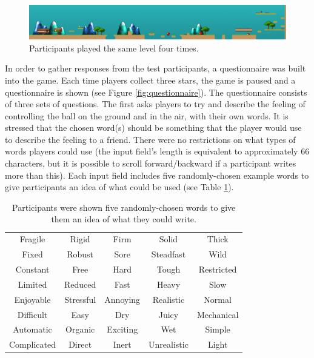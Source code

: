 \begin{figure}[htbp]
\centering
\includegraphics[width=1\textwidth]{Pics/levelStructure}
\caption{Participants played the same level four times.}
\label{fig:level}
\end{figure}

In order to gather responses from the test participants, a questionnaire was built into the game. Each time players collect three stars, the game is paused and a questionnaire is shown (see Figure \ref{fig:questionnaire}). The questionnaire consists of three sets of questions. The first asks players to try and describe the feeling of controlling the ball on the ground and in the air, with their own words. It is stressed that the chosen word(s) should be something that the player would use to describe the feeling to a friend. There were no restrictions on what types of words players could use (the input field's length is equivalent to approximately 66 characters, but it is possible to scroll forward/backward if a participant writes more than this). Each input field includes five randomly-chosen example words to give participants an idea of what could be used (see Table \ref{table:wordsExamples}).

\begin{table} \centering
\scriptsize
\caption{Participants were shown five randomly-chosen words to give them an idea of what they could write.}
\label{table:wordsExamples}
\begin{tabular}{ccccc}
\toprule
Fragile & Rigid & Firm & Solid & Thick\\
Fixed & Robust & Sore & Steadfast & Wild\\
Constant & Free & Hard & Tough & Restricted\\
Limited & Reduced & Fast & Heavy & Slow\\
Enjoyable & Stressful & Annoying & Realistic & Normal\\
Difficult & Easy & Dry & Juicy & Mechanical\\
Automatic & Organic & Exciting & Wet & Simple\\
Complicated & Direct & Inert & Unrealistic & Light\\
\bottomrule
\end{tabular}
\end{table}

